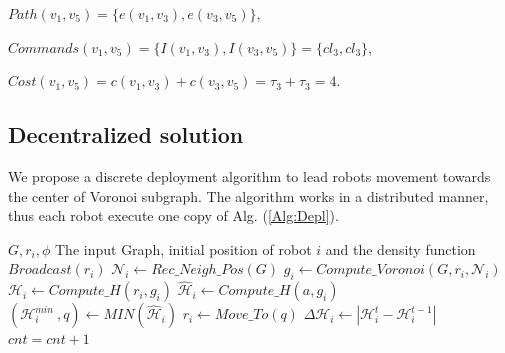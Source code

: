 \documentclass[twocolumn]{svjour3}       %
\begin{document}
$Path (v_1,v_5)=\{e(v_1,v_3),e(v_3,v_5)\}$,

$Commands(v_1,v_5)=\{I(v_1,v_3),I(v_3,v_5)\}=\{cl_3,cl_3\}$,

$Cost(v_1,v_5)=c(v_1,v_3)+c(v_3,v_5)=\tau_3+\tau_3=4$.
\subsection{Decentralized solution}

We propose a discrete deployment algorithm to lead robots movement towards the center of Voronoi subgraph. The algorithm works in a distributed manner, thus each robot execute one copy of Alg. (\ref{Alg:Depl}).

\begin{algorithm}[H]
  \renewcommand{\algorithmicrequire}{\textbf{Input:}}
    \renewcommand{\algorithmicensure}{\textbf{Output:}}
\caption{$Deployment~Algorithm~for~robot~i$ }
\label{Alg:Depl}
\begin{algorithmic}[1] 
    \REQUIRE $G, r_i, \phi$ The input Graph, initial position of robot $i$ and the density function
         	\STATE $Broadcast(r_i)$ 
         	\STATE $\mathcal{N}_i \gets Rec\_Neigh\_Pos(G)$ 
           	\STATE $g_i \gets Compute\_Voronoi(G,r_i,\mathcal{N}_i)$ 
             \STATE $\mathcal{H}_i \gets Compute\_H(r_i,g_i)$
             	\STATE $\hat{\mathcal{H}}_i \gets Compute\_H(a,g_i)$
           	\ENDFOR
            \STATE $(\mathcal{H}_i^{min}~, q) \gets MIN(\hat{\mathcal{H}}_i)$ 
                	\STATE $r_i \gets Move\_To(q)$ 
                \ENDIF 
                \STATE $\Delta \mathcal H_i \gets |\mathcal H_i^{t}-\mathcal H_i^{t-1}|$
                \STATE $cnt=cnt+1$ 
                \ENDIF
    	\ENDWHILE
\end{algorithmic}
\end{algorithm}
\end{document}
